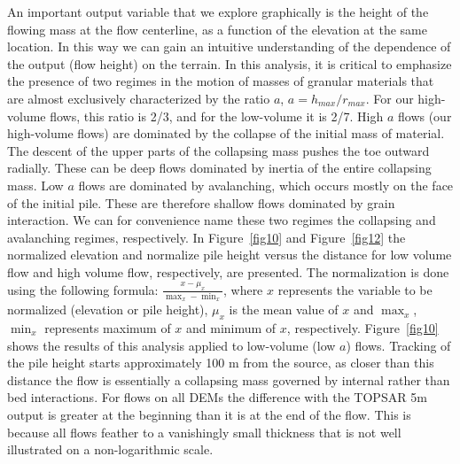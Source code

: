 \documentclass[12pt,letterpaper]{article}
\begin{document}
An important output variable that we explore graphically is the height of the flowing mass at 
the flow centerline, as a function of the elevation at the same location. 
In this way we can gain an intuitive understanding of the dependence of the output (flow height)
 on  the terrain. In this analysis, it is critical to emphasize the presence of two regimes in the motion of masses of granular materials \citep{Lubeetal2005, MangeneyCastelnauetal2004} that are almost exclusively characterized by the ratio $a$, $a = h_{max}/r_{max}$. For our high-volume flows, this ratio is 2/3, and for the low-volume it is 2/7. High $a$ flows (our high-volume flows) are dominated by the collapse of the initial mass of material.  The descent of the upper parts of the collapsing mass pushes the toe outward radially. These can be deep flows dominated by inertia of the entire collapsing mass. Low $a$ flows are dominated by avalanching, which occurs mostly on the face of the initial pile. These are therefore shallow flows dominated by grain interaction.  We can for convenience name these two regimes the collapsing and avalanching regimes, respectively.  
In Figure~\ref{fig10} and Figure~\ref{fig12} the normalized elevation and normalize pile height versus the distance for low volume flow and high volume flow, respectively, are presented. The normalization is done using the following formula: $\frac{x-\mu_x}{\max_x - \min_x}$, where $x$ represents the variable to be normalized (elevation or pile height), $\mu_x$ is the mean value of $x$ and $\max_x$, $\min_x$ represents maximum of $x$ and minimum of $x$, respectively.
Figure~\ref{fig10} shows the results of this analysis applied to low-volume (low $a$) flows. Tracking of the pile height starts approximately 100 m from the source, as closer than this distance the flow is essentially a collapsing mass governed by internal rather than bed interactions.  For flows on all DEMs the difference with the TOPSAR 5m output is greater at the beginning than it is at the end of the flow. This is because all flows feather to a vanishingly small thickness that is not well illustrated on a non-logarithmic scale.  
\end{document}
